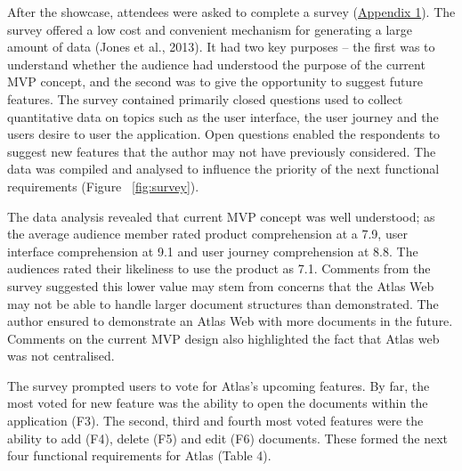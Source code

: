 \documentclass{article}
\begin{document}
After the showcase, attendees were asked to complete a survey (\hyperref[sec:appendix-1]{Appendix 1}). The survey offered a low cost and convenient mechanism for generating a large amount of data (Jones et al., 2013). It had two key purposes – the first was to understand whether the audience had understood the purpose of the current MVP concept, and the second was to give the opportunity to suggest future features. The survey contained primarily closed questions used to collect quantitative data on topics such as the user interface, the user journey and the users desire to user the application. Open questions enabled the respondents to suggest new features that the author may not have previously considered. The data was compiled and analysed to influence the priority of the next functional requirements (Figure ~\ref{fig:survey}).

The data analysis revealed that current MVP concept was well understood; as the average audience member rated product comprehension at a 7.9, user interface comprehension at  9.1 and user journey comprehension at 8.8. The audiences rated their likeliness to use the product as 7.1. Comments from the survey suggested this lower value may stem from concerns that the Atlas Web may not be able to handle larger document structures than demonstrated. The author ensured to demonstrate an Atlas Web with more documents in the future. Comments on the current MVP design also highlighted the fact that Atlas web was not centralised.

The survey prompted users to vote for Atlas’s upcoming features. By far, the most voted for new feature was the ability to open the documents within the application (F3). The second, third and fourth most voted features were the ability to add (F4), delete (F5) and edit (F6) documents. These formed the next four functional requirements for Atlas (Table 4).
\end{document}

